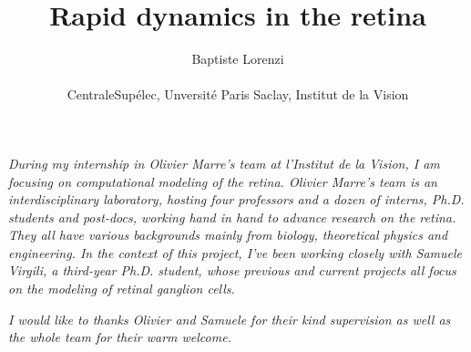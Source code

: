 \documentclass[12pt]{article}
\title{Rapid dynamics in the retina}
\author{Baptiste Lorenzi\\
    \\
    \normalsize{CentraleSupélec, Unversité Paris Saclay, Institut de la
        Vision}\\}
\date{}
\begin{document}

\baselineskip24pt


\maketitle


\textit{During my internship in Olivier Marre's team at l'Institut de la
    Vision, I am
    focusing on computational modeling of the retina. Olivier Marre's team is
    an
    interdisciplinary laboratory, hosting four professors and a dozen of
    interns,
    Ph.D. students and post-docs, working hand in hand to advance research
    on the retina. They all have various backgrounds mainly from biology,
    theoretical physics and engineering. In the context of this project, I've
    been
    working
    closely with Samuele Virgili, a third-year Ph.D. student, whose previous
    and
    current projects all focus on the modeling of retinal ganglion cells.}

\textit{I would like to thanks Olivier and Samuele for their kind supervision
    as well as the whole team for their
    warm welcome.}
\newline

\tableofcontents















\clearpage
\end{document}
